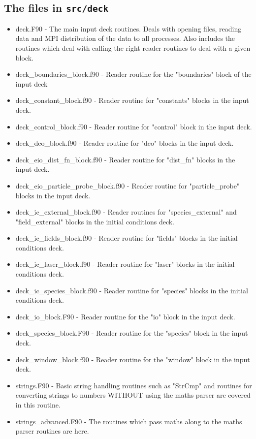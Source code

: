 \documentclass[12pt,a4paper]{article}
\newcommand{\inlinecode}[1]{{\color{warwickred} \bf\texttt{#1}}}
\begin{document}
\subsection{The files in \inlinecode{src/deck}}
\begin{itemize}
\item deck.F90 - The main input deck routines. Deals with opening files,
  reading data and MPI distribution of the data to all processes. Also
  includes the routines which deal with calling the right reader routines to
  deal with a given block.
\item deck\_boundaries\_block.f90 - Reader routine for the "boundaries" block
  of the input deck
\item deck\_constant\_block.f90 - Reader routine for "constants" blocks in the
  input deck.
\item deck\_control\_block.f90 - Reader routine for "control" block in the
  input deck.
\item deck\_deo\_block.f90 - Reader routine for "deo" blocks in the input
  deck.
\item deck\_eio\_dist\_fn\_block.f90 - Reader routine for "dist\_fn" blocks in
  the input deck.
\item deck\_eio\_particle\_probe\_block.f90 - Reader routine for
  "particle\_probe" blocks in the input deck.
\item deck\_ic\_external\_block.f90 - Reader routines for "species\_external"
  and "field\_external" blocks in the initial conditions deck.
\item deck\_ic\_fields\_block.f90 - Reader routine for "fields" blocks in the
  initial conditions deck.
\item deck\_ic\_laser\_block.f90 - Reader routine for "laser" blocks in the
  initial conditions deck.
\item deck\_ic\_species\_block.f90 - Reader routine for "species" blocks in
  the initial conditions deck.
\item deck\_io\_block.F90 - Reader routine for the "io" block in the input
  deck.
\item deck\_species\_block.F90 - Reader routine for the "species" block in the
  input deck.
\item deck\_window\_block.f90 - Reader routine for the "window" block in the
  input deck.
\item strings.F90 - Basic string handling routines such as "StrCmp" and
  routines for converting strings to numbers WITHOUT using the maths parser
  are covered in this routine.
\item strings\_advanced.F90 - The routines which pass maths along to the maths
  parser routines are here.
\end{itemize}
\end{document}
